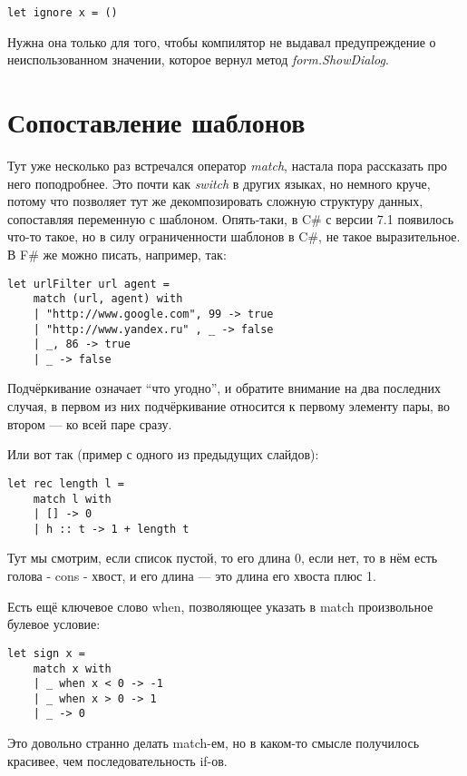 \documentclass[a5paper]{article}
\begin{document}
\begin{verbatim}
let ignore x = ()
\end{verbatim}

Нужна она только для того, чтобы компилятор не выдавал предупреждение о неиспользованном значении, которое вернул метод \textit{form.ShowDialog}.

\section{Сопоставление шаблонов}

Тут уже несколько раз встречался оператор \textit{match}, настала пора рассказать про него поподробнее. Это почти как \textit{switch} в других языках, но немного круче, потому что позволяет тут же декомпозировать сложную структуру данных, сопоставляя переменную с шаблоном. Опять-таки, в C\# с версии 7.1 появилось что-то такое, но в силу ограниченности шаблонов в C\#, не такое выразительное. В F\# же можно писать, например, так:

\begin{verbatim}
let urlFilter url agent =
    match (url, agent) with
    | "http://www.google.com", 99 -> true
    | "http://www.yandex.ru" , _ -> false
    | _, 86 -> true
    | _ -> false
\end{verbatim}

Подчёркивание означает ``что угодно'', и обратите внимание на два последних случая, в первом из них подчёркивание относится к первому элементу пары, во втором --- ко всей паре сразу.

Или вот так (пример с одного из предыдущих слайдов):

\begin{verbatim}
let rec length l =
    match l with
    | [] -> 0
    | h :: t -> 1 + length t
\end{verbatim}

Тут мы смотрим, если список пустой, то его длина 0, если нет, то в нём есть голова - cons - хвост, и его длина --- это длина его хвоста плюс 1.

Есть ещё ключевое слово when, позволяющее указать в match произвольное булевое условие:

\begin{verbatim}
let sign x =
    match x with
    | _ when x < 0 -> -1
    | _ when x > 0 -> 1
    | _ -> 0
\end{verbatim}

Это довольно странно делать match-ем, но в каком-то смысле получилось красивее, чем последовательность if-ов.
\end{document}
